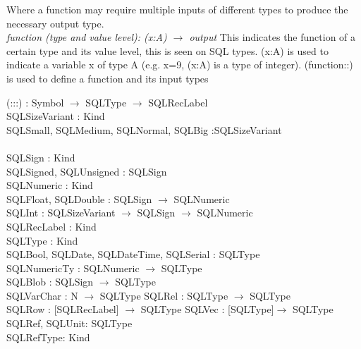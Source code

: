 \documentclass[12pt]{article}
\begin{document}
{{Where a function may require multiple inputs of different types to produce the 
necessary output type.\\

\textit{function (type and value level): (x:A) $\rightarrow$ output}
This indicates the function of a certain type and its value level, this is seen 
on SQL types. (x:A) is used to indicate a variable x of type A (e.g. x=9, (x:A) 
is a type of integer). (function::) is used to define a function and its input 
types 




 (:::) : Symbol $\rightarrow$ SQLType $\rightarrow$ SQLRecLabel \\
 
 SQLSizeVariant : Kind \\
 SQLSmall, SQLMedium, SQLNormal, SQLBig :SQLSizeVariant \\ \\
 
 SQLSign : Kind \\
 SQLSigned, SQLUnsigned : SQLSign  \\
 
 SQLNumeric : Kind \\
 SQLFloat, SQLDouble : SQLSign $\rightarrow$ SQLNumeric \\
 
 SQLInt : SQLSizeVariant $\rightarrow$ SQLSign $\rightarrow$ SQLNumeric \\
 SQLRecLabel : Kind \\

 SQLType : Kind \\
 SQLBool, SQLDate, SQLDateTime, SQLSerial : SQLType \\
 
 SQLNumericTy : SQLNumeric $\rightarrow$ SQLType  \\
 SQLBlob : SQLSign $\rightarrow$ SQLType \\
 
 SQLVarChar : N $\rightarrow$ SQLType 
 SQLRel : SQLType $\rightarrow$ SQLType \\
 
 SQLRow : [SQLRecLabel] $\rightarrow$ SQLType 
 SQLVec : [SQLType]$\rightarrow$ SQLType \\
 
 SQLRef, SQLUnit: SQLType \\
 SQLRefType: Kind\\
 
}}
\end{document}
